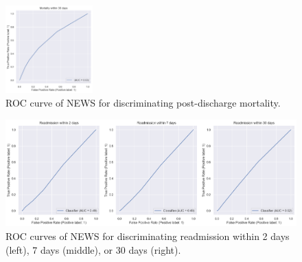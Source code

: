 \documentclass[10pt,journal, compsoc]{IEEEtran}
\begin{document}
\begin{figure}[htbp]
    \centering
    \includegraphics[width=0.3\textwidth]{img/30daymortality_roc.png}
    \caption{ROC curve of NEWS for discriminating post-discharge mortality.}
    \label{fig:30day_roc}
\end{figure}

\begin{figure}[htbp]
    \centering
    \includegraphics[width=\textwidth]{img/readmission_roc.png}
    \caption{ROC curves of NEWS for discriminating readmission within 2 days (left), 7 days (middle), or 30 days (right).}
    \label{fig:readmission_roc}
\end{figure}
\end{document}
